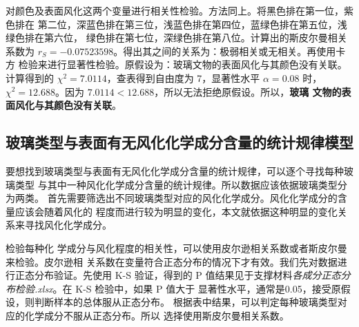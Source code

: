 \documentclass[withoutpreface,bwprint]{cumcmthesis} %
\begin{document}
对颜色及表面风化这两个变量进行相关性检验。方法同上。将黑色排在第一位，紫色排在
第二位，深蓝色排在第三位，浅蓝色排在第四位，蓝绿色排在第五位，浅绿色排在第六位，
绿色排在第七位，深绿色排在第八位。计算出的斯皮尔曼相关
系数为 $r_S = -0.07523598$。得出其之间的关系为：极弱相关或无相关。再使用卡方
检验来进行显著性检验。原假设为：玻璃文物的表面风化与其颜色没有关联。计算得到的
$\chi^2=7.0114$，查表得到自由度为 7，显著性水平 $\alpha=0.08$ 时，
$\chi^2=12.688$。因为 $7.0114<12.688$，所以无法拒绝原假设。所以，\textbf{玻璃
    文物的表面风化与其颜色没有关联}。

\subsection{玻璃类型与表面有无风化化学成分含量的统计规律模型}
要想找到玻璃类型与表面有无风化化学成分含量的统计规律，可以逐个寻找每种玻璃类型
与其中一种风化化学成分含量的统计规律。所以数据应该依据玻璃类型分为两类。
首先需要筛选出不同玻璃类型对应的风化化学成分。风化化学成分的含量应该会随着风化的
程度而进行较为明显的变化，本文就依据这种明显的变化关系来寻找风化化学成分。

检验每种化
学成分与风化程度的相关性，可以使用皮尔逊相关系数或者斯皮尔曼来检验。皮尔逊相
关系数在变量符合正态分布的情况下才有效。我们先对数据进行正态分布验证。先使用
K-S 验证，得到的 P 值结果见于支撑材料\emph{各成分正态分布检验.xlsx}。在 K-S 检验中，如果 P 值大于
显著性水平，通常是0.05，接受原假设，则判断样本的总体服从正态分布。
根据表中结果，可以判定每种玻璃类型对应的化学成分不服从正态分布。所以
选择使用斯皮尔曼相关系数。
\end{document}
